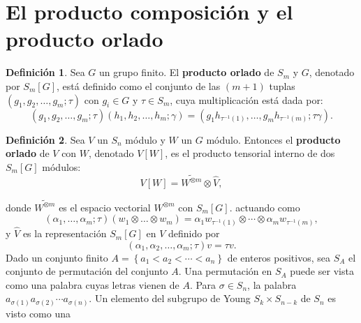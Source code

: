 \documentclass[12pt]{book}
\newtheorem{theorem}{Teorema}[section]
\theoremstyle{definition}
\newtheorem{definition}[theorem]{Definición}
\newcounter{in}
\newcounter{ini}
\begin{document}
\section{El producto composición y el producto orlado}
\label{pr_or}
\begin{definition}
Sea $G$ un grupo finito. El \textbf{producto orlado} de $S_m$ y $G$, denotado
por $S_m\left [ G \right ]$, está definido como el conjunto de las
$(m+1)$ tuplas $(g_1,g_2, \ldots, g_m ; \tau)$ con $g_i \in G$ y
$\tau \in S_m$, cuya multiplicación está dada por: 
\begin{equation*}
(g_1,g_2, \ldots, g_m ; \tau)(h_1,h_2, \ldots, h_m ; \gamma) = (g_{1} h_{\tau^{-1}(1)}, \ldots, g_{m} h_{\tau^{-1}(m)}; \tau \gamma).
\end{equation*}
\end{definition}
\begin{definition}
  \label{wre_pro}
  Sea $V$ un $S_n$ módulo y $W$ un $G$ módulo. Entonces el
  \textbf{producto orlado} de $V$ con $W$, denotado
  $V\left [ W \right ]$, es el producto tensorial interno de dos
  $S_m\left [ G \right ]$ módulos:
  $$V \left [ W \right ] = \widetilde{W^{\otimes m}} \otimes \hat{V},$$
\end{definition}
donde $ \widetilde{W^{\otimes m}}$ es el espacio vectorial
$W^{\otimes m}$ con $S_m \left [ G \right ] .$ actuando como
  \begin{equation}
    \label{eq:w_p_1}
    (\alpha_{1},\ldots,\alpha_{m}; \tau)(w_{1} \otimes \ldots \otimes w_{m}) = \alpha_{1}w_{\tau^{-1}(1)} \otimes \cdots \otimes \alpha_{m}w_{\tau^{-1}(m)}, 
  \end{equation}
y $\hat{V}$ es la representación
  $S_m \left [ G \right ]$ en $V$ definido por
  \begin{equation}
    \label{eq:106}
    (\alpha_{1},\alpha_{2},\ldots,\alpha_{m}; \tau)v = \tau v .
  \end{equation}
Dado un conjunto finito
$A = \left \{ a_1 < a_2< \cdots < a_n \right \}$ de enteros positivos,
sea $S_A$ el conjunto de permutación del conjunto $A$. Una permutación
en $S_A$ puede ser vista como una palabra cuyas letras vienen de
$A$. Para $\sigma \in S_n$, la palabra
$a_{\sigma(1)}a_{\sigma(2)} \cdots a_{\sigma(n)}$. Un elemento del
subgrupo de Young $S_{k} \times S_{n-k}$ de $S_n$ es visto como una
\end{document}
